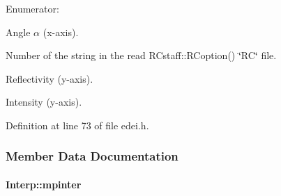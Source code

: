 \begin{Desc}
\item[Enumerator: ]\par
\begin{description}
\item[{\em 
\hypertarget{classInterp_a48f7a943f951c25a9717d1849cf7cd87ac3491d178c3b4d99946346d29aa1a278}{
ALPHA}
\label{classInterp_a48f7a943f951c25a9717d1849cf7cd87ac3491d178c3b4d99946346d29aa1a278}
}]Angle $\alpha$ (x-\/axis). \item[{\em 
\hypertarget{classInterp_a48f7a943f951c25a9717d1849cf7cd87ad059eb3ed702d77d4a397615966abe49}{
NUMBER}
\label{classInterp_a48f7a943f951c25a9717d1849cf7cd87ad059eb3ed702d77d4a397615966abe49}
}]Number of the string in the read RCstaff::RCoption() \char`\"{}RC\char`\"{} file. \item[{\em 
\hypertarget{classInterp_a48f7a943f951c25a9717d1849cf7cd87addb4fb6c1edaa033ac3bd54e0f79f297}{
REFLECT}
\label{classInterp_a48f7a943f951c25a9717d1849cf7cd87addb4fb6c1edaa033ac3bd54e0f79f297}
}]Reflectivity (y-\/axis). \item[{\em 
\hypertarget{classInterp_a48f7a943f951c25a9717d1849cf7cd87aaaeebe62ae30762d4708f741e206fe91}{
INTENS}
\label{classInterp_a48f7a943f951c25a9717d1849cf7cd87aaaeebe62ae30762d4708f741e206fe91}
}]Intensity (y-\/axis). \end{description}
\end{Desc}



Definition at line 73 of file edei.h.



\subsubsection{Member Data Documentation}
\hypertarget{classInterp_af2350a967b89741ad75e3c8725d32a56}{
\paragraph[{mpinter}]{ {\bf Interp::mpinter}}\hfill}
\label{classInterp_af2350a967b89741ad75e3c8725d32a56}


